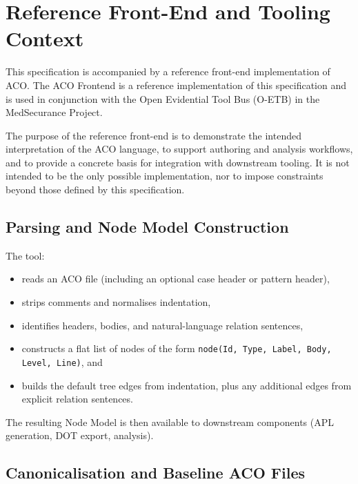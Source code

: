 \documentclass[11pt]{article}
\begin{document}
\section{Reference Front-End and Tooling Context}
\label{sec:frontend}

This specification is accompanied by a reference front-end implementation of ACO.
The ACO Frontend is a reference implementation of this specification and is used in
conjunction with the Open Evidential Tool Bus (O-ETB) in the MedSecurance Project.

The purpose of the reference front-end is to demonstrate the intended interpretation
of the ACO language, to support authoring and analysis workflows, and to provide a
concrete basis for integration with downstream tooling. It is not intended to be the
only possible implementation, nor to impose constraints beyond those defined by this
specification.

\subsection*{Parsing and Node Model Construction}

The tool:
\begin{itemize}[leftmargin=2em]
  \item reads an ACO file (including an optional case header or pattern header),
  \item strips comments and normalises indentation,
  \item identifies headers, bodies, and natural-language relation sentences,
  \item constructs a flat list of nodes of the form
    \texttt{node(Id, Type, Label, Body, Level, Line)}, and
  \item builds the default tree edges from indentation, plus any additional edges from explicit relation sentences.
\end{itemize}

The resulting Node Model is then available to downstream components (APL generation, DOT export, analysis).

\subsection*{Canonicalisation and Baseline ACO Files}
\end{document}
